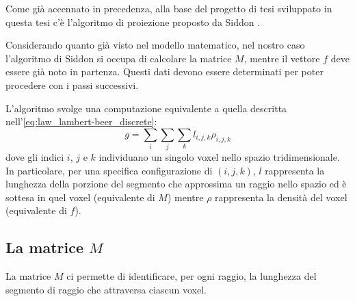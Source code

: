 \documentclass[12pt,a4paper]{report}
\begin{document}
Come già accennato in precedenza, alla base del progetto di tesi sviluppato in questa tesi c'è l'algoritmo di proiezione proposto
da Siddon \cite{Siddon1984}.

Considerando quanto già visto nel modello matematico, nel nostro caso l'algoritmo di Siddon si occupa di calcolare la matrice
\(M\), mentre il vettore \(f\) deve essere già noto in partenza.
Questi dati devono essere determinati per poter procedere con i passi successivi.

L'algoritmo svolge una computazione equivalente a quella descritta nell'\autoref{eq:law_lambert-beer_discrete}:
\begin{equation} \label{eq:law_lambert-beer_Siddon}
  g = \sum_i \sum_j \sum_k l_{i, j, k} \rho_{i, j, k}
\end{equation}
dove gli indici \(i\), \(j\) e \(k\) individuano un singolo voxel nello spazio tridimensionale.
In particolare, per una specifica configurazione di \((i, j, k)\), \(l\) rappresenta la lunghezza della porzione del segmento che
approssima un raggio nello spazio ed è sottesa in quel voxel (equivalente di \(M\)) mentre \(\rho\) rappresenta la densità del
voxel (equivalente di \(f\)).

\subsection{La matrice \texorpdfstring{\(M\)}{M}}

La matrice \(M\) ci permette di identificare, per ogni raggio, la lunghezza del segmento di raggio che attraversa ciascun voxel.
\end{document}
